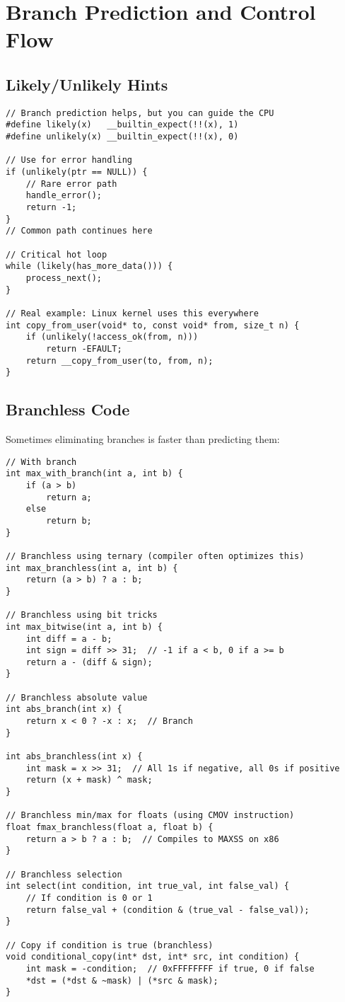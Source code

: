 \section{Branch Prediction and Control Flow}

\subsection{Likely/Unlikely Hints}

\begin{lstlisting}
// Branch prediction helps, but you can guide the CPU
#define likely(x)   __builtin_expect(!!(x), 1)
#define unlikely(x) __builtin_expect(!!(x), 0)

// Use for error handling
if (unlikely(ptr == NULL)) {
    // Rare error path
    handle_error();
    return -1;
}
// Common path continues here

// Critical hot loop
while (likely(has_more_data())) {
    process_next();
}

// Real example: Linux kernel uses this everywhere
int copy_from_user(void* to, const void* from, size_t n) {
    if (unlikely(!access_ok(from, n)))
        return -EFAULT;
    return __copy_from_user(to, from, n);
}
\end{lstlisting}

\subsection{Branchless Code}

Sometimes eliminating branches is faster than predicting them:

\begin{lstlisting}
// With branch
int max_with_branch(int a, int b) {
    if (a > b)
        return a;
    else
        return b;
}

// Branchless using ternary (compiler often optimizes this)
int max_branchless(int a, int b) {
    return (a > b) ? a : b;
}

// Branchless using bit tricks
int max_bitwise(int a, int b) {
    int diff = a - b;
    int sign = diff >> 31;  // -1 if a < b, 0 if a >= b
    return a - (diff & sign);
}

// Branchless absolute value
int abs_branch(int x) {
    return x < 0 ? -x : x;  // Branch
}

int abs_branchless(int x) {
    int mask = x >> 31;  // All 1s if negative, all 0s if positive
    return (x + mask) ^ mask;
}

// Branchless min/max for floats (using CMOV instruction)
float fmax_branchless(float a, float b) {
    return a > b ? a : b;  // Compiles to MAXSS on x86
}

// Branchless selection
int select(int condition, int true_val, int false_val) {
    // If condition is 0 or 1
    return false_val + (condition & (true_val - false_val));
}

// Copy if condition is true (branchless)
void conditional_copy(int* dst, int* src, int condition) {
    int mask = -condition;  // 0xFFFFFFFF if true, 0 if false
    *dst = (*dst & ~mask) | (*src & mask);
}
\end{lstlisting}

